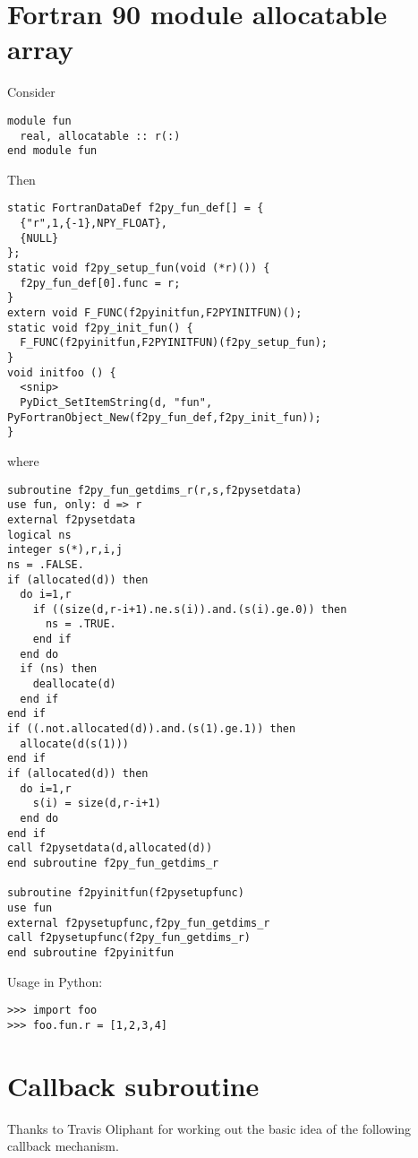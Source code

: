 \documentclass{article}
\begin{document}
\section{Fortran 90 module allocatable array}
\label{sec:f90modallocarr}

Consider
\begin{verbatim}
module fun
  real, allocatable :: r(:)
end module fun
\end{verbatim}
Then
\begin{verbatim}
static FortranDataDef f2py_fun_def[] = {
  {"r",1,{-1},NPY_FLOAT},
  {NULL}
};
static void f2py_setup_fun(void (*r)()) {
  f2py_fun_def[0].func = r;
}
extern void F_FUNC(f2pyinitfun,F2PYINITFUN)();
static void f2py_init_fun() {
  F_FUNC(f2pyinitfun,F2PYINITFUN)(f2py_setup_fun);
}
void initfoo () {
  <snip>
  PyDict_SetItemString(d, "fun", PyFortranObject_New(f2py_fun_def,f2py_init_fun));
}
\end{verbatim}
where
\begin{verbatim}
subroutine f2py_fun_getdims_r(r,s,f2pysetdata)
use fun, only: d => r
external f2pysetdata
logical ns
integer s(*),r,i,j
ns = .FALSE.
if (allocated(d)) then
  do i=1,r
    if ((size(d,r-i+1).ne.s(i)).and.(s(i).ge.0)) then
      ns = .TRUE.
    end if
  end do
  if (ns) then 
    deallocate(d) 
  end if
end if
if ((.not.allocated(d)).and.(s(1).ge.1)) then
  allocate(d(s(1)))
end if
if (allocated(d)) then
  do i=1,r
    s(i) = size(d,r-i+1)
  end do
end if
call f2pysetdata(d,allocated(d))
end subroutine f2py_fun_getdims_r

subroutine f2pyinitfun(f2pysetupfunc)
use fun
external f2pysetupfunc,f2py_fun_getdims_r
call f2pysetupfunc(f2py_fun_getdims_r)
end subroutine f2pyinitfun
\end{verbatim}
Usage in Python:
\begin{verbatim}
>>> import foo
>>> foo.fun.r = [1,2,3,4]
\end{verbatim}

\section{Callback subroutine}
\label{sec:cbsubr}

Thanks to Travis Oliphant for working out the basic idea of the
following callback mechanism.
\end{document}
